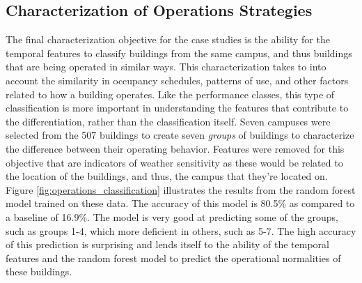 \subsection{Characterization of Operations Strategies}
\label{sec:operations_strategies}

The final characterization objective for the case studies is the ability for the temporal features to classify buildings from the same campus, and thus buildings that are being operated in similar ways. This characterization takes to into account the similarity in occupancy schedules, patterns of use, and other factors related to how a building operates. Like the performance classes, this type of classification is more important in understanding the features that contribute to the differentiation, rather than the classification itself. Seven campuses were selected from the 507 buildings to create seven \emph{groups} of buildings to characterize the difference between their operating behavior. Features were removed for this objective that are indicators of weather sensitivity as these would be related to the location of the buildings, and thus, the campus that they're located on. Figure \ref{fig:operations_classification} illustrates the results from the random forest model trained on these data. The accuracy of this model is 80.5\% as compared to a baseline of 16.9\%. The model is very good at predicting some of the groups, such as groups 1-4, which more deficient in others, such as 5-7. The high accuracy of this prediction is surprising and lends itself to the ability of the temporal features and the random forest model to predict the operational normalities of these buildings.